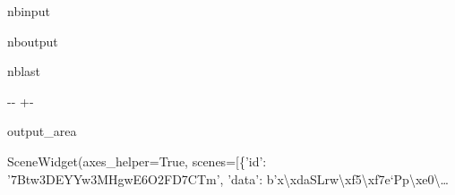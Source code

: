 \documentclass[letterpaper,10pt,english]{sphinxmanual}
\begin{document}
\begin{sphinxuseclass}{nbinput}
{
\begin{sphinxVerbatim}[commandchars=\\\{\}]
\llap{\color{nbsphinxin}[11]:\,\hspace{\fboxrule}\hspace{\fboxsep}}
             
              
\end{sphinxVerbatim}
}

\end{sphinxuseclass}
\begin{sphinxuseclass}{nboutput}
\begin{sphinxuseclass}{nblast}
{

\kern-\sphinxverbatimsmallskipamount\kern-\baselineskip
\kern+\FrameHeightAdjust\kern-\fboxrule
\vspace{\nbsphinxcodecellspacing}

\begin{sphinxuseclass}{output_area}
\begin{sphinxuseclass}{}


\begin{sphinxVerbatim}[commandchars=\\\{\}]
\llap{\color{nbsphinxout}[11]:\,\hspace{\fboxrule}\hspace{\fboxsep}}SceneWidget(axes\_helper=True, scenes=[\{'id': '7Btw3DEYYw3MHgwE6O2FD7CTm', 'data': b'x\textbackslash{}xdaSLrw\textbackslash{}xf5\textbackslash{}xf7e`Pp\textbackslash{}xe0\textbackslash{}…
\end{sphinxVerbatim}



\end{sphinxuseclass}
\end{sphinxuseclass}
}

\end{sphinxuseclass}
\end{sphinxuseclass}
\end{document}
